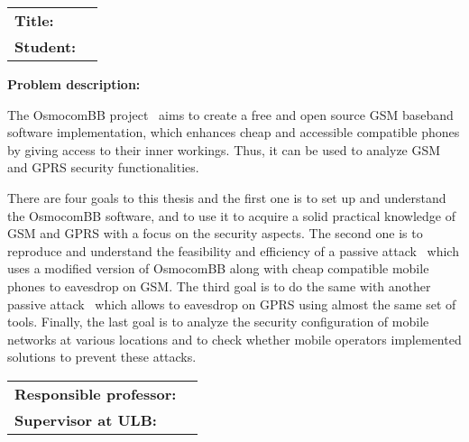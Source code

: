 \begin{titlingpage}

\noindent
\begin{tabular}{@{}p{4cm}l}
\textbf{Title:} 	& \thetitle \\
\textbf{Student:}	& \theauthor \\
\end{tabular}

\vspace{4ex}
\noindent\textbf{Problem description:}
\vspace{2ex}

\noindent 

The OsmocomBB project~\cite{osmocombb_2015} aims to create a free
and open source GSM baseband software implementation, which enhances
cheap and accessible compatible phones by giving access to their inner
workings. Thus, it can be used to analyze GSM and GPRS security
functionalities.

There are four goals to this thesis and the first one is to set up and
understand the OsmocomBB software, and to use it to acquire a solid
practical knowledge of GSM and GPRS with a focus on the security
aspects. The second one is to reproduce and understand the feasibility
and efficiency of a passive attack~\cite{munaut_wideband_2010} which
uses a modified version of OsmocomBB along with cheap compatible mobile
phones to eavesdrop on GSM. The third goal is to do the same with
another passive attack~\cite{melette_gprs_2011} which allows to
eavesdrop on GPRS using almost the same set of tools. Finally, the last
goal is to analyze the security configuration of mobile networks at
various locations and to check whether mobile operators implemented
solutions to prevent these attacks.

\vspace{6ex}

\noindent
\begin{tabular}{@{}p{4cm}l}
\textbf{Responsible professor:} 	& \theprofessor \\
\textbf{Supervisor at ULB:}			& \thesupervisor \\
\end{tabular}

\end{titlingpage}
